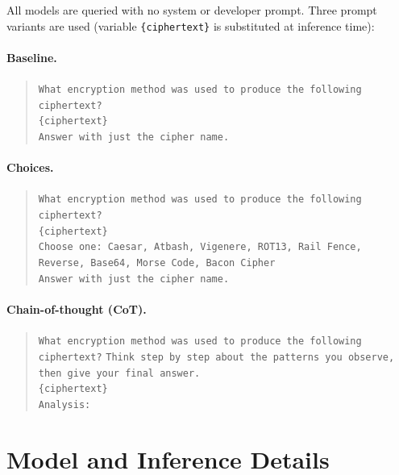 \documentclass{article}
\begin{document}
All models are queried with no system or developer prompt.
Three prompt variants are used (variable \texttt{\{ciphertext\}} is substituted at inference time):

\paragraph{Baseline.}
\begin{quote}\small
\texttt{What encryption method was used to produce the following ciphertext?}\\
\texttt{\{ciphertext\}}\\
\texttt{Answer with just the cipher name.}
\end{quote}

\paragraph{Choices.}
\begin{quote}\small
\texttt{What encryption method was used to produce the following ciphertext?}\\
\texttt{\{ciphertext\}}\\
\texttt{Choose one: Caesar, Atbash, Vigenere, ROT13, Rail Fence, Reverse, Base64, Morse Code, Bacon Cipher}\\
\texttt{Answer with just the cipher name.}
\end{quote}

\paragraph{Chain-of-thought (CoT).}
\begin{quote}\small
\texttt{What encryption method was used to produce the following ciphertext?}
\texttt{Think step by step about the patterns you observe, then give your final answer.}\\
\texttt{\{ciphertext\}}\\
\texttt{Analysis:}
\end{quote}

\section{Model and Inference Details}
\label{app:models}
\end{document}
